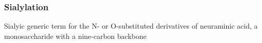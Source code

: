 \subsubsection {Sialylation}
Sialyic generic term for the N- or O-substituted derivatives of neuraminic acid, a monosaccharide with a nine-carbon backbone